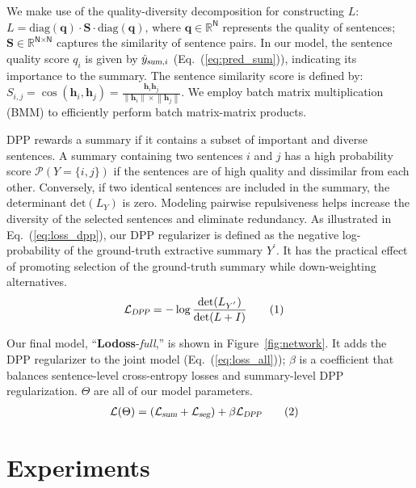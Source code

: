 \documentclass[11pt]{article}
\newcommand\numberthis{\addtocounter{equation}{1}\tag{\theequation}}
\newcommand{\norm}[1]{\left\lVert#1\right\rVert}
\begin{document}
We make use of the quality-diversity decomposition for constructing $L$:
$L = \mbox{diag}(\mathbf{q}) \cdot \mathbf{S} \cdot \mbox{diag}(\mathbf{q})$,
where $\mathbf{q} \in \mathbb{R}^\textsf{N}$ represents the quality of sentences;
$\mathbf{S} \in \mathbb{R}^{\textsf{N} \times \textsf{N}}$ captures the similarity of sentence pairs.
In our model, the sentence quality score $q_i$ is given by $\hat{y}_{\textsl{sum},i}$ (Eq.~(\ref{eq:pred_sum})),
indicating its importance to the summary.
The sentence similarity score is defined by: 
$S_{i,j} = \cos(\mathbf{h}_i, \mathbf{h}_j) = \frac{\mathbf{h}_{i}\mathbf{h}_{j}}{\norm{\mathbf{h}_i} \times \norm{\mathbf{h}_j}}$.
We employ batch matrix multiplication (BMM) to efficiently perform batch matrix-matrix products.


DPP rewards a summary if it contains a subset of important and diverse sentences.
A summary containing two sentences $i$ and $j$ 
has a high probability score $\mathcal{P}(Y=\{i,j\})$ if the sentences are of high quality
and dissimilar from each other.
Conversely, if two identical sentences are included in the summary,
the determinant $\mbox{det}(L_{Y})$ is zero.
Modeling pairwise repulsiveness
helps increase the diversity of the selected sentences
and eliminate redundancy.
As illustrated in Eq.~(\ref{eq:loss_dpp}),
our DPP regularizer is defined as the negative log-probability of the ground-truth extractive summary $Y^{'}$.
It has the practical effect of promoting selection of the ground-truth summary 
while down-weighting alternatives. 
\begin{align*}
& \mathcal{L}_{\textsl{DPP}} = -\log \frac{\mbox{det}(L_{Y^{'}})}{\mbox{det}(L + I)} 
\numberthis\label{eq:loss_dpp}
\end{align*}


Our final model, ``\textbf{Lodoss}-\emph{full},'' is shown in Figure~\ref{fig:network}. 
It adds the DPP regularizer to the joint model (Eq.~(\ref{eq:loss_all}));
$\beta$ is a coefficient that balances sentence-level cross-entropy losses and summary-level DPP regularization.
$\Theta$ are all of our model parameters.
\begin{align*}
&\mathcal{L}(\Theta) = (\mathcal{L}_{\textsl{sum}} + \mathcal{L}_{\textsl{seg}}) + \beta \mathcal{L}_{\textsl{DPP}}
\numberthis\label{eq:loss_all}
\end{align*}



\section{Experiments}
\label{sec:expr}
\end{document}
